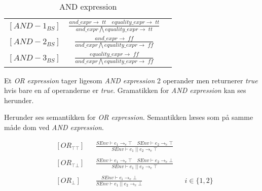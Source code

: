     \bgroup
    \def\arraystretch{3}
    \begin{table}[H]
    \centering
    \begin{tabular}{l c l}
        
        $[AND-1_{BS}]$ &$\frac{and\_expr \rightarrow \; tt \quad equality\_expr \rightarrow \; tt}{and\_expr \bigwedge equality\_expr \rightarrow \; tt}$ & \\
    
        $[AND-2_{BS}]$ &$\frac{and\_expr \rightarrow \; ff}{and\_expr \bigwedge equality\_expr \rightarrow \; ff}$ & \\
        
        $[AND-3_{BS}]$ &$\frac{equality\_expr \rightarrow \; ff}{and\_expr \bigwedge equality\_expr \rightarrow \; ff}$ & \\
        
    \end{tabular}
    \caption{AND expression}
    \label{tab:andexpr}
    \end{table}
    \egroup

Et \textit{OR expression} tager ligesom \textit{AND expression} 2 operander men returnerer \textit{true} hvis bare en af operanderne er \textit{true}. Gramatikken for \textit{AND expression} kan ses herunder.


\noindent Herunder ses semantikken for \textit{OR expression}. Semantikken læses som på samme måde dom ved \textit{AND expression}.

\begin{align*}
&[OR_{\top\top}] & &\frac{SEnv \vdash e_1 \rightarrow_e \top \quad SEnv \vdash e_2 \rightarrow_e \top}{SEnv \vdash e_1\; ||\; e_2 \rightarrow_e \top}\\\\
&[OR_{\top\bot}] & &\frac{SEnv \vdash e_1 \rightarrow_e \top \quad SEnv \vdash e_2 \rightarrow_e \bot}{SEnv \vdash e_1\; ||\; e_2 \rightarrow_e \top}\\\\
&[OR_\bot] & &\frac{SEnv \vdash e_i \rightarrow_e \bot}{SEnv \vdash e_1 \;||\; e_2 \rightarrow_e \bot} & &i \in \{1, 2\}\\\\
\end{align*}

